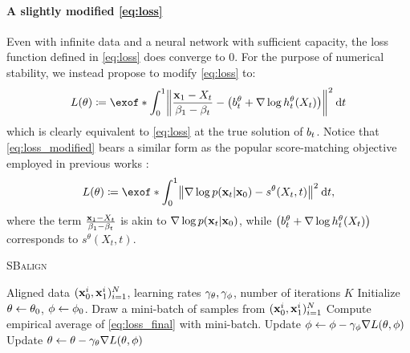 \paragraph{A slightly modified \eqref{eq:loss}}
Even with infinite data and a neural network with sufficient capacity, the loss function defined in \eqref{eq:loss} does converge to 0. For the purpose of numerical stability, we instead propose to modify \eqref{eq:loss} to:
\begin{equation}
\label{eq:loss_modified}
\Loss(\theta) \defeq \exof*{\int_0^1 \norm*{\frac{\x_1-X_t}{\cvolat[\horizon]-\cvolat[\ctime]}- \left(\fdrift^\theta + \nabla \log \doob^\theta(X_t)\right)}^2 \dt  }
\end{equation}which is clearly equivalent to \eqref{eq:loss} at the true solution of $\fdrift$. Notice that \eqref{eq:loss_modified} bears a similar form as the popular score-matching objective employed in previous works \citep{song2019generative,song2020score}:
\begin{equation}
\label{eq:score_matching}
\Loss(\theta) \defeq \exof*{\int_0^1 \norm*{\nabla \log p(\x_t | \x_0)- s^\theta(X_t, t)}^2 \dt  },
\end{equation}
where the term $\frac{\x_1-X_t}{\cvolat[\horizon]-\cvolat[\ctime]}$ is akin to $\nabla \log p(\x_t | \x_0)$, while $\left(\fdrift^\theta + \nabla \log \doob^\theta(X_t)\right)$ corresponds to $s^\theta(X_t, t)$. 


 \begin{algorithm}[t]
   \caption{\textsc{SBalign}}
   \label{alg:SBalign}
\begin{algorithmic}
    Aligned data $(\x^i_0,\x^i_1)_{i=1}^N$, learning rates $\lrf,\lrb$, number of iterations $K$ %
\smallskip
   \STATE Initialize $\paramf \subs \paramf_0$, $\paramb \subs \paramb_0$.
   \STATE Draw a mini-batch of samples from $(\x^i_0,\x^i_1)_{i=1}^N$
   \STATE Compute empirical average of \eqref{eq:loss_final} with mini-batch.
   \STATE Update $\paramb \subs \paramb - \lrb\nabla \Loss(\theta,\phi)$
   \STATE Update $\paramf \subs \paramf - \lrf\nabla \Loss(\theta,\phi)$
   \ENDFOR
\end{algorithmic}
\end{algorithm}

